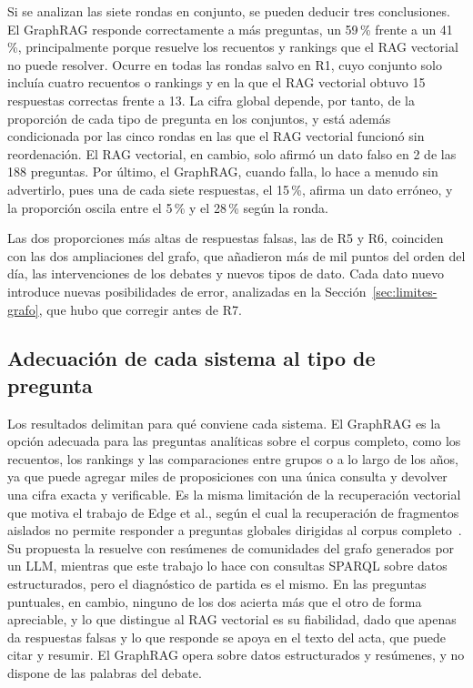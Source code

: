 \documentclass[11pt, a4paper]{report}
\begin{document}
	Si se analizan las siete rondas en conjunto, se pueden deducir tres conclusiones. El GraphRAG responde correctamente a más preguntas, un 59\,\% frente a un
	41\,\%, principalmente porque resuelve los recuentos y rankings que el RAG vectorial
	no puede resolver. Ocurre en todas las rondas salvo en R1, cuyo conjunto solo
	incluía cuatro recuentos o rankings y en la que el RAG vectorial obtuvo 15
	respuestas correctas frente a 13. La cifra global depende, por tanto, de la
	proporción de cada tipo de pregunta en los conjuntos, y está además
	condicionada por las cinco rondas en las que el RAG vectorial funcionó sin
	reordenación. El RAG vectorial, en cambio, solo afirmó un dato
	falso en 2 de las 188 preguntas. Por último, el
	GraphRAG, cuando falla, lo hace a menudo sin advertirlo, pues una de cada siete
	respuestas, el 15\,\%, afirma un dato erróneo, y la proporción oscila entre el
	5\,\% y el 28\,\% según la ronda.

	Las dos proporciones más altas de respuestas falsas, las de R5 y R6, coinciden
	con las dos ampliaciones del grafo, que añadieron más de mil puntos del
	orden del día, las intervenciones de los debates y nuevos tipos de dato. Cada
	dato nuevo introduce nuevas posibilidades de error, analizadas en la
	Sección~\ref{sec:limites-grafo}, que hubo que corregir antes de R7.

	\subsection{Adecuación de cada sistema al tipo de pregunta}
	\label{sec:comparativa}

	Los resultados delimitan para qué conviene cada sistema. El GraphRAG es la
	opción adecuada para las preguntas analíticas sobre el corpus completo, como
	los recuentos, los rankings y las comparaciones entre grupos o a lo largo de los años, ya que puede agregar miles de proposiciones con una única consulta y
	devolver una cifra exacta y verificable. Es la misma limitación de la
	recuperación vectorial que motiva el trabajo de Edge et al., según el cual la
	recuperación de fragmentos aislados no permite responder a preguntas globales dirigidas al
	corpus completo~\cite{edge2024-graphrag}. Su propuesta la resuelve con
	resúmenes de comunidades del grafo generados por un LLM, mientras que este
	trabajo lo hace con consultas SPARQL sobre datos estructurados, pero el
	diagnóstico de partida es el mismo. En las preguntas puntuales, en cambio,
	ninguno de los dos acierta más que el otro de forma apreciable, y lo que distingue al
	RAG vectorial es su fiabilidad, dado que apenas da respuestas falsas y lo que
	responde se apoya en el texto del acta, que puede citar y resumir. El GraphRAG opera
	sobre datos estructurados y resúmenes, y no dispone de las palabras del
	debate.
\end{document}
